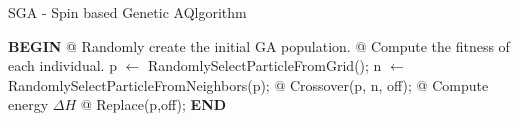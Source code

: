 \documentclass[runningheads,a4paper,11pt]{report}
\begin{document}
\begin{algorithm}
	\caption{SGA - Spin based Genetic AQlgorithm}
	\label{NGalg}
		\begin{algorithmic}


			\STATE \textbf{BEGIN}
  		\STATE @ Randomly create the initial GA population.
  		\STATE @ Compute the fitness of each individual.
  				\STATE p $\leftarrow$ RandomlySelectParticleFromGrid();
  				\STATE n $\leftarrow$ RandomlySelectParticleFromNeighbors(p);
  				\STATE @ Crossover(p, n, off);
  				\STATE @ Compute energy $\Delta H$
  					\STATE @ Replace(p,off);
  				\ENDIF
  			\ENDFOR
  		\ENDFOR
  		\STATE \textbf{END}
\end{algorithmic}
\end{algorithm}




\end{document}
